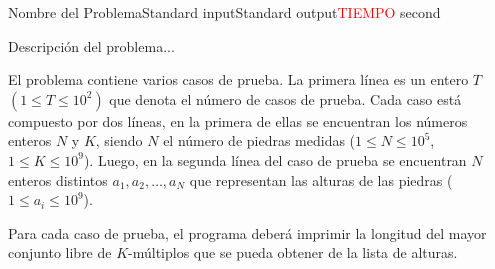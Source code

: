 \begin{problem}{Nombre del Problema}{Standard input}{Standard output}{\textcolor{red}{TIEMPO} second}{}


Descripci\'on del problema...

\InputFile
El problema contiene varios casos de prueba. La primera l\'inea es un entero $T$ $(1\leq T \leq 10^2)$ que denota el número de casos de prueba. Cada caso está compuesto por dos l\'ineas, en la primera de ellas se encuentran los n\'umeros enteros $N$ y $K$, siendo $N$ el número de piedras medidas ($1 \leq N \leq 10^5$, $1 \leq K \leq 10^9$). Luego, en la segunda l\'inea del caso de prueba se encuentran $N$ enteros distintos $a_1, a_2, \dots, a_N$ que representan las alturas de las piedras ($1 \leq a_i \leq 10^9$).

\OutputFile
Para cada caso de prueba, el programa deber\'a imprimir la longitud del mayor conjunto libre de $K$-m\'ultiplos que se pueda obtener de la lista de alturas.

\Example

\begin{example}
\end{example}

\end{problem}
